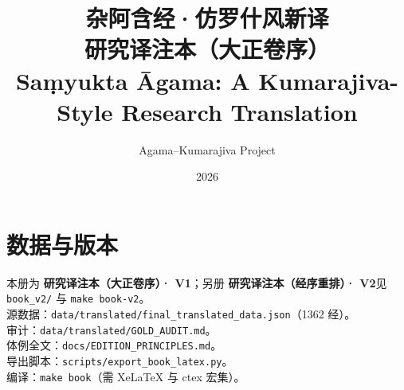 \documentclass[UTF8, zihao=-4, openany, fontset=none]{ctexbook}
\title{\textbf{杂阿含经·仿罗什风新译}\\[0.5em]
\large 研究译注本（大正卷序）\\[0.35em]
\normalsize Saṃyukta Āgama: A Kumarajiva-Style Research Translation}
\author{Agama–Kumarajiva Project}
\date{2026}
\begin{document}

\clearpage
{}
\setcounter{page}{1}
\tableofcontents
\clearpage







\mainmatter



\backmatter
\chapter*{数据与版本}

\noindent 本册为 \textbf{研究译注本（大正卷序）· V1}；另册 \textbf{研究译注本（经序重排）· V2}见 \texttt{book\_v2/} 与 \texttt{make book-v2}。\\
源数据：\texttt{data/translated/final\_translated\_data.json}（1362 经）。\\
审计：\texttt{data/translated/GOLD\_AUDIT.md}。\\
体例全文：\texttt{docs/EDITION\_PRINCIPLES.md}。\\
导出脚本：\texttt{scripts/export\_book\_latex.py}。\\
编译：\texttt{make book}（需 XeLaTeX 与 ctex 宏集）。
\end{document}
